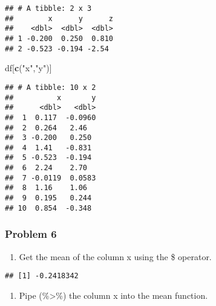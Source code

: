 \documentclass[]{article}
\newenvironment{Shaded}{\begin{snugshade}}{\end{snugshade}}
\newcommand{\DataTypeTok}[1]{\textcolor[rgb]{0.13,0.29,0.53}{#1}}
\newcommand{\DecValTok}[1]{\textcolor[rgb]{0.00,0.00,0.81}{#1}}
\newcommand{\KeywordTok}[1]{\textcolor[rgb]{0.13,0.29,0.53}{\textbf{#1}}}
\newcommand{\NormalTok}[1]{#1}
\newcommand{\OperatorTok}[1]{\textcolor[rgb]{0.81,0.36,0.00}{\textbf{#1}}}
\newcommand{\StringTok}[1]{\textcolor[rgb]{0.31,0.60,0.02}{#1}}
\providecommand{\tightlist}{%
  \setlength{\itemsep}{0pt}\setlength{\parskip}{0pt}}
\begin{document}
\begin{verbatim}
## # A tibble: 2 x 3
##        x      y      z
##    <dbl>  <dbl>  <dbl>
## 1 -0.200  0.250  0.810
## 2 -0.523 -0.194 -2.54
\end{verbatim}

\begin{Shaded}
\begin{Highlighting}[]
\NormalTok{df[}\KeywordTok{c}\NormalTok{(}\StringTok{"x"}\NormalTok{,}\StringTok{"y"}\NormalTok{)]}
\end{Highlighting}
\end{Shaded}

\begin{verbatim}
## # A tibble: 10 x 2
##          x       y
##      <dbl>   <dbl>
##  1  0.117  -0.0960
##  2  0.264   2.46  
##  3 -0.200   0.250 
##  4  1.41   -0.831 
##  5 -0.523  -0.194 
##  6  2.24    2.70  
##  7 -0.0119  0.0583
##  8  1.16    1.06  
##  9  0.195   0.244 
## 10  0.854  -0.348
\end{verbatim}

\hypertarget{problem-6}{%
\subsubsection{Problem 6}\label{problem-6}}

\begin{enumerate}
\def\labelenumi{\alph{enumi}.}
\tightlist
\item
  Get the mean of the column x using the \$ operator.
\end{enumerate}

\begin{Shaded}
\end{Shaded}

\begin{verbatim}
## [1] -0.2418342
\end{verbatim}

\begin{enumerate}
\def\labelenumi{\alph{enumi}.}
\setcounter{enumi}{1}
\tightlist
\item
  Pipe (\%\textgreater{}\%) the column x into the mean function.
\end{enumerate}
\end{document}
